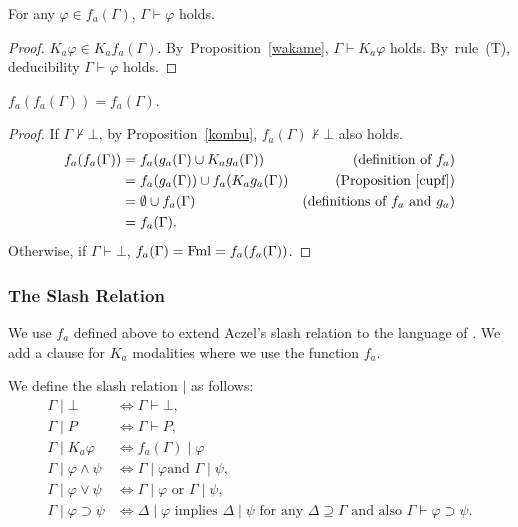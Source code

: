 \begin{proposition}
 \label{kombu}
 For any $\varphi\in f_a(\Gamma)$, $\Gamma\vdash\varphi$ holds.
\end{proposition}
\begin{proof}
 $K_a\varphi\in K_af_a(\Gamma)$. By~Proposition~\ref{wakame},
 $\Gamma\vdash K_a\varphi$ holds.
 By~rule~(T), deducibility $\Gamma\vdash\varphi$ holds.
\end{proof}

\begin{proposition}
 \label{f_double}
 $f_a(f_a(\Gamma)) = f_a(\Gamma)$.
\end{proposition}
\begin{proof}
 If $\Gamma\not\vdash\bot$, by Proposition~\ref{kombu}, $f_a(\Gamma)\not\vdash\bot$ also holds.
 \begin{align*}
  f_a(f_a(\Gamma))
  &= f_a(g_a(\Gamma)\cup K_ag_a(\Gamma))
  &\text{(definition of $f_a$)}
\\
  &= f_a(g_a(\Gamma))\cup f_a(K_ag_a(\Gamma))
  &\text{(Proposition~\ref{cupf})}
\\
  &= \emptyset \cup f_a(\Gamma)
  &\text{(definitions of $f_a$ and $g_a$)}
\\
  &= f_a(\Gamma).
 \end{align*}
 Otherwise, if $\Gamma\vdash\bot$,
 $f_a(\Gamma) = \operatorname{Fml} = f_a(f_a(\Gamma))$.
\end{proof}

\subsubsection{The Slash Relation}

\newcommand{\aslash}[0]{\mathbin{\mid}}
We use $f_a$ defined above to extend Aczel's slash relation to the language of \iec.
We add a clause for $K_a$ modalities where we use the function $f_a$.
\begin{definition}
 We define the slash relation $\aslash$ as follows:
 \begin{align*}
  \Gamma\aslash\bot& \Longleftrightarrow \Gamma\vdash\bot, \\
  \Gamma\aslash{}P& \Longleftrightarrow \Gamma\vdash P, \\
  \Gamma\aslash K_a\varphi &\Longleftrightarrow f_a(\Gamma)\aslash\varphi
  \\
  \Gamma\aslash \varphi \wedge \psi & \Longleftrightarrow \Gamma\aslash\varphi\text{
  and }\Gamma\aslash\psi,\\
  \Gamma\aslash \varphi\vee\psi &\Longleftrightarrow \Gamma\aslash\varphi\text{ or
  }\Gamma\aslash\psi,\\
  \Gamma\aslash \varphi\supset\psi &\Longleftrightarrow \Delta\aslash\varphi
  \text{ implies
  }\Delta\aslash\psi \text{ for any } \Delta\supseteq\Gamma
  \text{ and also }\Gamma\vdash{}\varphi\supset\psi.
 \end{align*}
\end{definition}

